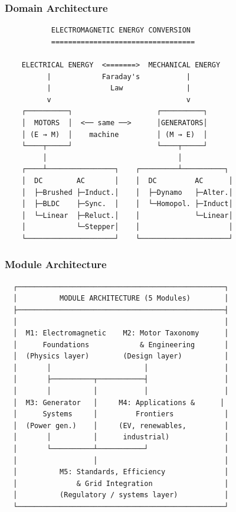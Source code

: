 \documentclass[11pt,letterpaper]{article}
\begin{document}
\subsubsection{Domain Architecture}

\begin{asciibox}
\begin{verbatim}
           ELECTROMAGNETIC ENERGY CONVERSION
           ==================================

    ELECTRICAL ENERGY  <=======>  MECHANICAL ENERGY
          |            Faraday's           |
          |              Law               |
          v                                v
    ┌──────────┐                    ┌──────────┐
    │  MOTORS  │  <── same ──>      │GENERATORS│
    │ (E → M)  │    machine         │ (M → E)  │
    └────┬─────┘                    └────┬─────┘
         │                               │
    ┌────┴────────────────┐    ┌─────────┴──────────┐
    │  DC        AC       │    │  DC         AC      │
    │  ├─Brushed ├─Induct.│    │  ├─Dynamo   ├─Alter.│
    │  ├─BLDC    ├─Sync.  │    │  └─Homopol. ├─Induct│
    │  └─Linear  ├─Reluct.│    │             └─Linear│
    │            └─Stepper│    │                     │
    └─────────────────────┘    └─────────────────────┘
\end{verbatim}
\end{asciibox}

\subsubsection{Module Architecture}

\begin{asciibox}
\begin{verbatim}
  ┌─────────────────────────────────────────────────┐
  │          MODULE ARCHITECTURE (5 Modules)        │
  ├─────────────────────────────────────────────────┤
  │                                                 │
  │  M1: Electromagnetic    M2: Motor Taxonomy      │
  │      Foundations            & Engineering       │
  │  (Physics layer)        (Design layer)          │
  │       │                      │                  │
  │       ├──────────┬───────────┤                  │
  │       │          │           │                  │
  │  M3: Generator   │     M4: Applications &      │
  │      Systems     │         Frontiers            │
  │  (Power gen.)    │     (EV, renewables,         │
  │       │          │      industrial)             │
  │       └──────────┴───────────┘                  │
  │                  │                              │
  │          M5: Standards, Efficiency              │
  │              & Grid Integration                 │
  │          (Regulatory / systems layer)           │
  └─────────────────────────────────────────────────┘
\end{verbatim}
\end{asciibox}
\end{document}

